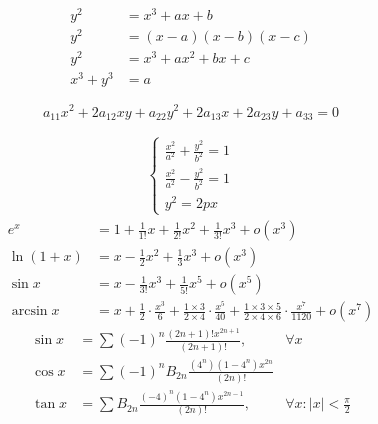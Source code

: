 \documentclass[12pt, a4paper, oneside]{ctexart}
\begin{document}
\begin{align}
    y^{2}         & = x^{3} + ax + b          \\
    y^{2}         & = (x - a)(x - b)(x - c)   \\
    y^{2}         & = x^{3} + ax^{2} + bx + c \\
    x^{3} + y^{3} & = a
\end{align}

\begin{equation}
    a_{11}x^2 + 2a_{12}xy + a_{22}y^2 + 2a_{13}x + 2a_{23}y + a_{33} = 0
\end{equation}

\begin{align}
    \begin{cases}
        \frac{x^2}{a^2} + \frac{y^2}{b^2}  = 1 \\
        \frac{x^2}{a^2} - \frac{y^2}{b^2}  = 1 \\
        y^2                                = 2px
    \end{cases}
\end{align}
\begin{align}
    e^x        & = 1 + \frac{1}{1!} x + \frac{1}{2!} x^2 + \frac{1}{3!} x^3 + o(x^3)                                                                                                                    \\
    \ln(1 + x) & = x - \frac{1}{2} x^2 + \frac{1}{3} x^3 + o(x^3)                                                                                                                                       \\
    \sin x     & = x - \frac{1}{3!} x^3 + \frac{1}{5!}x^5+ o(x^5)                                                                                                                                       \\
    \arcsin x  & =  x+ \frac{1}{2}\cdot\frac{x^{3}} { 6 }+\frac {  1\times 3 } { 2\times4 }\cdot\frac{x^{5}} {40 }+\frac {   1\times 3\times5 } {   2\times4\times6 }\cdot\frac{x^{7}} {1120 }+o(x^{7})
\end{align}
\begin{align}
    \sin x & = \sum (-1)^n \frac{(2n + 1)!x^{2n+1}}{(2n + 1)!},      & \forall x                       \\
    \cos x & = \sum (-1)^n B_{2n} \frac{(4^n)(1 - 4^n)x^{2n}}{(2n)!}                                   \\
    \tan x & = \sum B_{2n} \frac{(-4)^n(1 - 4^n)x^{2n-1}}{(2n)!},    & \forall x : |x| < \frac{\pi}{2}
\end{align}
\end{document}
